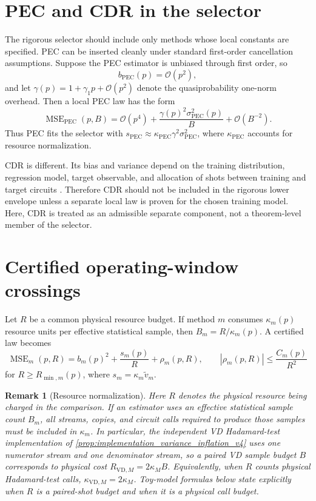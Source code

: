 \documentclass[11pt]{article}
\newtheorem{remark}{Remark}
\newcommand{\MSE}{\operatorname{MSE}}
\newcommand{\1}{\mathbf{1}}
\newcommand{\OO}{\mathcal{O}}
\newcommand{\abs}[1]{\left\lvert #1 \right\rvert}
\begin{document}
\section{PEC and CDR in the selector}

The rigorous selector should include only methods whose local constants are specified.  PEC can be inserted cleanly under standard first-order cancellation assumptions.  Suppose the PEC estimator is unbiased through first order, so
\begin{equation}
    b_{\mathrm{PEC}}(p)=\OO(p^2),
\end{equation}
and let \(\gamma(p)=1+\gamma_1p+\OO(p^2)\) denote the quasiprobability one-norm overhead.  Then a local PEC law has the form
\begin{equation}
    \MSE_{\mathrm{PEC}}(p,B)=\OO(p^4)+\frac{\gamma(p)^2\sigma_{\mathrm{PEC}}^2(p)}{B}+\OO(B^{-2}).
\end{equation}
Thus PEC fits the selector with \(s_{\mathrm{PEC}}\approx\kappa_{\mathrm{PEC}}\gamma^2\sigma_{\mathrm{PEC}}^2\), where \(\kappa_{\mathrm{PEC}}\) accounts for resource normalization.

CDR is different.  Its bias and variance depend on the training distribution, regression model, target observable, and allocation of shots between training and target circuits \citep{Czarnik2021,Lowe2021}.  Therefore CDR should not be included in the rigorous lower envelope unless a separate local law is proven for the chosen training model.  Here, CDR is treated as an admissible separate component, not a theorem-level member of the selector.

\section{Certified operating-window crossings}

Let \(R\) be a common physical resource budget.  If method \(m\) consumes \(\kappa_m(p)\) resource units per effective statistical sample, then \(B_m=R/\kappa_m(p)\).  A certified law becomes
\begin{equation}
    \MSE_m(p,R)=b_m(p)^2+\frac{s_m(p)}{R}+\rho_m(p,R),
    \qquad
    \abs{\rho_m(p,R)}\leq\frac{C_m(p)}{R^2}
\end{equation}
for \(R\geq R_{\min,m}(p)\), where \(s_m=\kappa_m\widetilde v_m\).


\begin{remark}[Resource normalization]
\label{rem:resource_normalization_v13}
Here \(R\) denotes the physical resource being charged in the comparison.  If an estimator uses an effective statistical sample count \(B_m\), all streams, copies, and circuit calls required to produce those samples must be included in \(\kappa_m\).  In particular, the independent VD Hadamard-test implementation of \cref{prop:implementation_variance_inflation_v4} uses one numerator stream and one denominator stream, so a paired VD sample budget \(B\) corresponds to physical cost \(R_{\mathrm{VD},M}=2\kappa_M B\).  Equivalently, when \(R\) counts physical Hadamard-test calls, \(\kappa_{\mathrm{VD},M}=2\kappa_M\).  Toy-model formulas below state explicitly when \(R\) is a paired-shot budget and when it is a physical call budget.
\end{remark}
\end{document}
